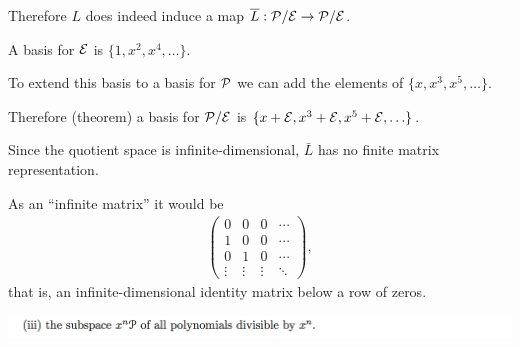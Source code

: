 \documentclass[12pt]{article}
\begin{document}
Therefore $L$ does indeed induce a map $\overline L:\mathcal P/\mathcal E \to \mathcal P/\mathcal E$.

A basis for $\mathcal E$ is $\{1, x^2, x^4, \ldots\}$.

To extend this basis to a basis for $\mathcal P$ we can add the elements of $\{x, x^3, x^5, \ldots\}$.

Therefore (theorem) a basis for $\mathcal P/\mathcal E$ is $\{x + \mathcal E, x^3 + \mathcal E, x^5 + \mathcal E, \ldots\}$.


Since the quotient space is infinite-dimensional, $\bar L$ has no finite matrix representation.

As an ``infinite matrix'' it would be
\begin{align*}
  \begin{pmatrix}
    0      & 0      & 0      & \cdots\\
    1      & 0      & 0      & \cdots\\
    0      & 1      & 0      & \cdots\\
    \vdots & \vdots & \vdots & \ddots
  \end{pmatrix},
\end{align*}
that is, an infinite-dimensional identity matrix below a row of zeros.

\begin{mdframed}
\includegraphics[width=400pt]{img/linear-algebra-a0-2-2-3.png}
\end{mdframed}
\end{document}
